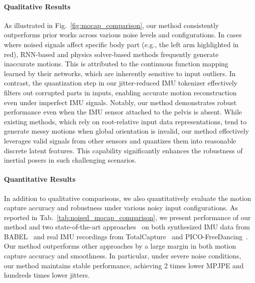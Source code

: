 \paragraph{Qualitative Results} As illustrated in Fig.~\ref{fig:mocap_comparison}, our method consistently outperforms prior works \cite{TransPoseSIGGRAPH2021,PIPCVPR2022} across various noise levels and configurations. In cases where noised signals affect specific body part (e.g., the left arm highlighted in red), RNN-based and physics solver-based methods frequently generate inaccurate motions. This is attributed to the continuous function mapping learned by their networks, which are inherently sensitive to input outliers. In contrast, the quantization step in our jitter-reduced IMU tokenizer effectively filters out corrupted parts in inputs, enabling accurate motion reconstruction even under imperfect IMU signals. Notably, our method demonstrates robust performance even when the IMU sensor attached to the pelvis is absent. While existing methods, which rely on root-relative input data representations, tend to generate messy motions when global orientation is invalid, our method effectively leverages valid signals from other sensors and quantizes them into reasonable discrete latent features. This capability significantly enhances the robustness of inertial posers in such challenging scenarios.

\vspace{-4mm}
\paragraph{Quantitative Results}
In addition to qualitative comparisons, we also quantitatively evaluate the motion capture accuracy and robustness under various noisy input configurations. As reported in Tab.~\ref{tab:noised_mocap_comparison}, we present performance of our method and two state-of-the-art approaches~\cite{TransPoseSIGGRAPH2021,PIPCVPR2022} on both synthesized IMU data from BABEL~\cite{braams:babel,AMASS:ICCV:2019} and real IMU recordings from TotalCapture~\cite{trumble2017total} and PICO-FreeDancing~\cite{dai2024hmd}. Our method outperforms other approaches by a large margin in both motion capture accuracy and smoothness. In particular, under severe noise conditions, our method maintains stable performance, achieving 2 times lower MPJPE and hundreds times lower jitters.

